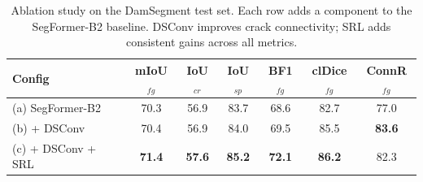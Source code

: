 \begin{table}[t]
\centering
\caption{Ablation study on the DamSegment test set. Each row adds a component to the SegFormer-B2 baseline. DSConv improves crack connectivity; SRL adds consistent gains across all metrics.}
\label{tab:ablation}
\begin{tabular}{lcccccc}
\toprule
Config & mIoU$_{fg}$ & IoU$_{cr}$ & IoU$_{sp}$ & BF1$_{fg}$ & clDice$_{fg}$ & ConnR$_{fg}$ \\
\midrule
(a) SegFormer-B2 & 70.3 & 56.9 & 83.7 & 68.6 & 82.7 & 77.0 \\
(b) + DSConv & 70.4 & 56.9 & 84.0 & 69.5 & 85.5 & \textbf{83.6} \\
(c) + DSConv + SRL & \textbf{71.4} & \textbf{57.6} & \textbf{85.2} & \textbf{72.1} & \textbf{86.2} & 82.3 \\
\bottomrule
\end{tabular}
\end{table}
